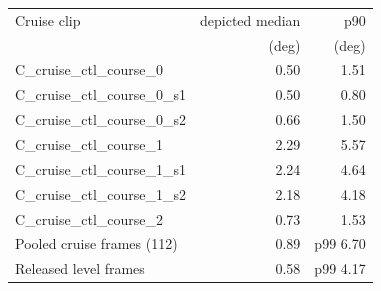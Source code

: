 \begin{tabular}{lrr}
\toprule
Cruise clip & depicted median & p90 \\
 & (deg) & (deg) \\
\midrule
C\_cruise\_ctl\_course\_0 & 0.50 & 1.51 \\
C\_cruise\_ctl\_course\_0\_s1 & 0.50 & 0.80 \\
C\_cruise\_ctl\_course\_0\_s2 & 0.66 & 1.50 \\
C\_cruise\_ctl\_course\_1 & 2.29 & 5.57 \\
C\_cruise\_ctl\_course\_1\_s1 & 2.24 & 4.64 \\
C\_cruise\_ctl\_course\_1\_s2 & 2.18 & 4.18 \\
C\_cruise\_ctl\_course\_2 & 0.73 & 1.53 \\
\midrule
Pooled cruise frames (112) & 0.89 & p99 6.70 \\
Released level frames & 0.58 & p99 4.17 \\
\bottomrule
\end{tabular}
